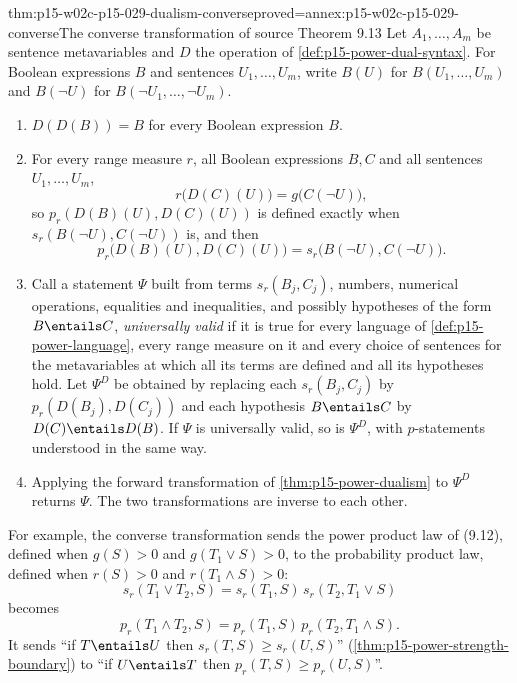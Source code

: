 \begin{hbtheorem}{thm:p15-w02c-p15-029-dualism-converse}{proved=annex:p15-w02c-p15-029-converse}{The converse transformation of source Theorem 9.13}
Let \(A_1,\ldots,A_m\) be sentence metavariables and \(D\) the operation
of \cref{def:p15-power-dual-syntax}. For Boolean expressions \(B\) and
sentences \(U_1,\ldots,U_m\), write \(B(U)\) for
\(B(U_1,\ldots,U_m)\) and \(B(\neg U)\) for
\(B(\neg U_1,\ldots,\neg U_m)\).
\begin{enumerate}
\item \(D(D(B))=B\) for every Boolean expression \(B\).
\item For every range measure \(r\), all Boolean expressions \(B,C\) and
  all sentences \(U_1,\ldots,U_m\),
  \[
   r\bigl(D(C)(U)\bigr)=g\bigl(C(\neg U)\bigr),
  \]
  so \(p_r(D(B)(U),D(C)(U))\) is defined exactly when
  \(s_r(B(\neg U),C(\neg U))\) is, and then
  \[
   p_r\bigl(D(B)(U),D(C)(U)\bigr)=s_r\bigl(B(\neg U),C(\neg U)\bigr).
  \]
\item Call a statement \(\Psi\) built from terms \(s_r(B_j,C_j)\),
  numbers, numerical operations, equalities and inequalities, and
  possibly hypotheses of the form \(B\entails C\), \emph{universally
  valid} if it is true for every language of
  \cref{def:p15-power-language}, every range measure on it and every
  choice of sentences for the metavariables at which all its terms are
  defined and all its hypotheses hold. Let \(\Psi^D\) be obtained by
  replacing each \(s_r(B_j,C_j)\) by \(p_r(D(B_j),D(C_j))\) and each
  hypothesis \(B\entails C\) by \(D(C)\entails D(B)\). If \(\Psi\) is
  universally valid, so is \(\Psi^D\), with \(p\)-statements understood
  in the same way.
\item Applying the forward transformation of \cref{thm:p15-power-dualism}
  to \(\Psi^D\) returns \(\Psi\). The two transformations are inverse to
  each other.
\end{enumerate}
For example, the converse transformation sends the power product law of
(9.12), defined when \(g(S)>0\) and \(g(T_1\lor S)>0\), to the
probability product law, defined when \(r(S)>0\) and
\(r(T_1\land S)>0\):
\[
 s_r(T_1\lor T_2,S)=s_r(T_1,S)\,s_r(T_2,T_1\lor S)
\]
becomes
\[
 p_r(T_1\land T_2,S)=p_r(T_1,S)\,p_r(T_2,T_1\land S).
\]
It sends ``if \(T\entails U\) then
\(s_r(T,S)\ge s_r(U,S)\)'' (\cref{thm:p15-power-strength-boundary}) to
``if \(U\entails T\) then \(p_r(T,S)\ge p_r(U,S)\)''.
\end{hbtheorem}

